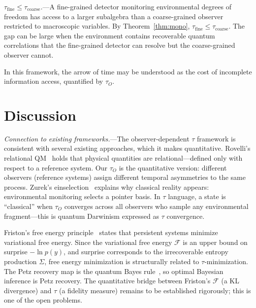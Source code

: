 \documentclass[prl,twocolumn,superscriptaddress,longbibliography,floatfix]{revtex4-2}
\newcommand{\tauasym}{\tau}
\begin{document}
\emph{$\tauasym_{\mathrm{fine}} \leq \tauasym_{\mathrm{coarse}}$.}---A fine-grained detector monitoring environmental degrees of freedom
has access to a larger subalgebra than a coarse-grained observer restricted
to macroscopic variables.  By
Theorem~\ref{thm:mono}, $\tauasym_{\mathrm{fine}} \leq
\tauasym_{\mathrm{coarse}}$.  The gap can be large when the
environment contains recoverable quantum correlations that the
fine-grained detector can resolve but the coarse-grained observer cannot.

In this framework, the arrow of time may be understood as
the cost of incomplete information access, quantified by
$\tauasym_O$.

\section{Discussion}
\label{sec:discussion}

\emph{Connection to existing frameworks.}---The
observer-dependent $\tauasym$ framework is consistent with
several existing approaches, which it makes quantitative.
Rovelli's relational QM~\cite{Rovelli1996} holds that physical
quantities are relational---defined only with respect to a
reference system.  Our $\tauasym_O$ is the quantitative version:
different observers (reference systems) assign different temporal
asymmetries to the same process.  Zurek's
einselection~\cite{Zurek2003} explains why classical reality
appears: environmental monitoring selects a pointer basis.  In
$\tauasym$ language, a state is ``classical'' when $\tauasym_O$
converges across all observers who sample any environmental
fragment---this is quantum Darwinism expressed as $\tauasym$
convergence.

Friston's free energy principle~\cite{Friston2010} states that
persistent systems minimize variational free energy.  Since the
variational free energy $\mathcal{F}$ is an upper bound on
surprise $-\ln p(y)$, and surprise corresponds to the
irrecoverable entropy production $\Sigma$, free energy
minimization is structurally related to $\tauasym$-minimization.
The Petz recovery map is the quantum Bayes
rule~\cite{Parzygnat2023,Fullwood2023}, so
optimal Bayesian inference is Petz recovery.  The quantitative
bridge between Friston's $\mathcal{F}$ (a KL divergence) and
$\tauasym$ (a fidelity measure) remains to be established
rigorously; this is one of the open problems.
\end{document}
